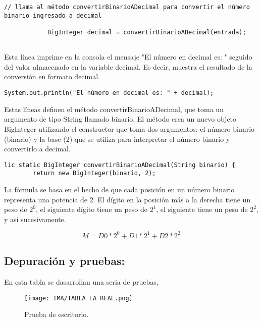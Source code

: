 \begin{lstlisting}[style=javaStyle]
 // llama al método convertirBinarioADecimal para convertir el número binario ingresado a decimal
 
            BigInteger decimal = convertirBinarioADecimal(entrada);
            
\end{lstlisting}

 Esta línea imprime en la consola el mensaje "El número en decimal es: " seguido del valor almacenado en la variable decimal. Es decir, muestra el resultado de la conversión en formato decimal.

\begin{lstlisting}[style=javaStyle]
System.out.println("El número en decimal es: " + decimal);

\end{lstlisting}

Estas líneas definen el método convertirBinarioADecimal, que toma un argumento de tipo String llamado binario. El método crea un nuevo objeto BigInteger utilizando el constructor que toma dos argumentos: el número binario (binario) y la base (2) que se utiliza para interpretar el número binario y convertirlo a decimal. 

\begin{lstlisting}[style=javaStyle]
lic static BigInteger convertirBinarioADecimal(String binario) {
        return new BigInteger(binario, 2);

\end{lstlisting}

\text La fórmula se basa en el hecho de que cada posición en un número binario representa una potencia de 2. El dígito en la posición más a la derecha tiene un peso de \(2^0\), el siguiente dígito tiene un peso de \(2^1\), el siguiente tiene un peso de \(2^2\), y así sucesivamente.
\space

\begin{equation}

M = D0 * 2^0 + D1 * 2^1 + D2 * 2^2

\end{equation}


\subsection{\textbf{Depuración y pruebas:}}
En esta tabla se dasarrollan una seria de pruebas, 
\begin{figure}[H]
    \centering
    \texttt{[image: IMA/TABLA LA REAL.png]}
    \caption{Prueba de escritorio.}
\end{figure}
